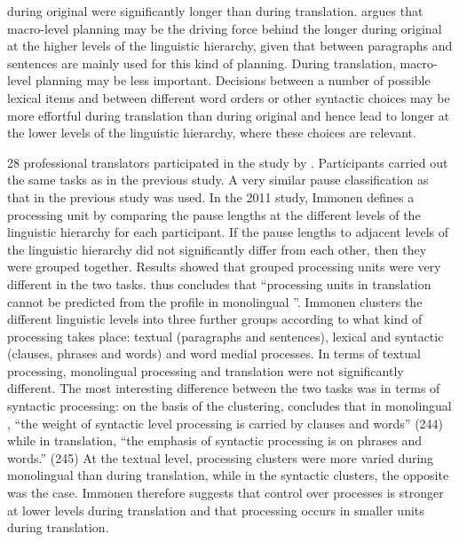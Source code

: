 \documentclass[output=paper]{LSP/langsci}
\begin{document}
during original  were significantly longer than during translation. \citet[333]{Immonen2006} argues that macro-level planning may be the driving force behind the longer  during original  at the higher levels of the linguistic hierarchy, given that  between paragraphs and sentences are mainly used for this kind of planning. During translation, macro-level planning may be less important. Decisions between a number of possible lexical items and between different word orders or other syntactic choices may be more effortful during translation than during original  and hence lead to longer  at the lower levels of the linguistic hierarchy, where these choices are relevant.

28 professional translators participated in the study by \citet{Immonen2011}. Participants carried out the same tasks as in the previous study. A very similar pause classification as that in the previous study was used. In the 2011 study, Immonen defines a processing unit by comparing the pause lengths at the different levels of the linguistic hierarchy for each participant. If the pause lengths to adjacent levels of the linguistic hierarchy did not significantly differ from each other, then they were grouped together. Results showed that grouped processing units were very different in the two tasks. \citet[243]{Immonen2011} thus concludes that ``processing units in translation cannot be predicted from the profile in monolingual ''. Immonen clusters the different linguistic levels into three further groups according to what kind of processing takes place: textual (paragraphs and sentences), lexical and syntactic (clauses, phrases and words) and word medial processes. In terms of textual processing, monolingual processing and translation were not significantly different. The most interesting difference between the two tasks was in terms of syntactic processing: on the basis of the clustering, \citet{Immonen2011} concludes that in monolingual , ``the weight of syntactic level processing is carried by clauses and words'' (244) while in translation, ``the emphasis of syntactic processing is on phrases and words.'' (245) At the textual level, processing clusters were more varied during monolingual  than during translation, while in the syntactic clusters, the opposite was the case. Immonen therefore suggests that control over processes is stronger at lower levels during translation and that processing occurs in smaller units during translation.
\end{document}
